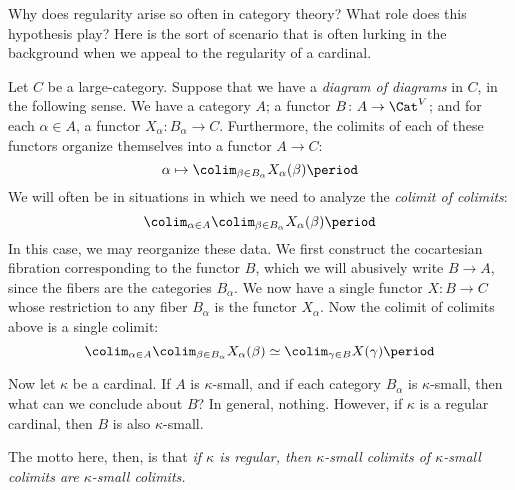 \begin{eg}
	Why does regularity arise so often in category theory?
	What role does this hypothesis play?
	Here is the sort of scenario that is often
	lurking in the background when we appeal to the
	regularity of a cardinal.

	Let $ C $ be a large-category.
	Suppose that we have a \emph{diagram of diagrams} in $ C $,
	in the following sense.
	We have a category $ A $;
	a functor $ B \colon A \to \Cat^V $;
	and for each $ \alpha \in A $,
	a functor $ X_{\alpha} \colon B_{\alpha} \to C $.
	Furthermore, the colimits of each of these functors
	organize themselves into a functor
	$ A \to C $:
	\[
		\alpha \mapsto \colim_{\beta \in B_{\alpha}}
		X_{\alpha}(\beta) \period
	\]
	We will often be in situations in which
	we need to analyze the \emph{colimit of colimits}:
	\[
		\colim_{\alpha \in A}
		\colim_{\beta \in B_{\alpha}} X_{\alpha}(\beta) \period
	\]
	In this case, we may reorganize these data.
	We first construct the cocartesian fibration
	corresponding to the functor $ B $,
	which we will abusively write $ B \to A $,
	since the fibers are the categories $ B_{\alpha} $.
	We now have a single functor $ X \colon B \to C $
	whose restriction to any fiber $ B_{\alpha} $
	is the functor $ X_{\alpha} $.
	Now the colimit of colimits above is a single colimit:
	\[
		\colim_{\alpha \in A}
		\colim_{\beta \in B_{\alpha}} X_{\alpha}(\beta) \simeq
		\colim_{\gamma \in B} X(\gamma) \period
	\]

	Now let $ \kappa $ be a cardinal.
	If $ A $ is $ \kappa $-small,
	and if each category $ B_{\alpha} $ is $ \kappa $-small,
	then what can we conclude about $ B $?
	In general, nothing.
	However, if $ \kappa $ is a regular cardinal,
	then $ B $ is also $ \kappa $-small.

	The motto here, then, is that
	\emph{%
		if $ \kappa $ is regular,
		then $ \kappa $-small colimits
		of $ \kappa $-small colimits
		are $ \kappa $-small colimits.
	}
\end{eg}


